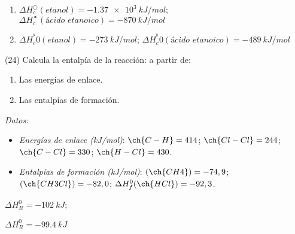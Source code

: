 \documentclass[10pt]{article}
\newenvironment{gexdatos}{
      \vspace{2pt}\noindent\textit{Datos: }
    }{\vspace{5pt}}
\begin{document}
\begin{multicols}{2}
\begin{solution}
  \begin{enumerate}
    \item \( \Delta H^○_c (\textit{etanol}) = \SI{-1.37e3}{kJ/mol} \); \newline
          \( \Delta H^\mdsmwhtcircle_c (\textit{ácido etanoico}) = \SI{-870}{kJ/mol} \) %
    \item \( \Delta H_c^^b0 (\textit{etanol}) = \SI{-273}{kJ/mol} \); \newline
          \( \Delta H_c^^b0 (\textit{ácido etanoico}) = \SI{-489}{kJ/mol} \) %
  \end{enumerate}
\end{solution}




\begin{exercise}[
    tags    = {},
    topics  = {química, termodinámica, termoquímica},
    source  = {FQ 1B MGH 2016, p168, e24},
  ]
  (24) Calcula la entalpía de la reacción:
   a partir de:
  \begin{enumerate}
    \item Las energías de enlace.
    \item Las entalpías de formación.
  \end{enumerate}

  \begin{gexdatos}
    \begin{itemize}
      \item \textit{Energías de enlace (\si{kJ/mol})}:
      \( \ch{C-H} = 414 \); \( \ch{Cl-Cl} = 244 \); \( \ch{C-Cl} = 330 \); \( \ch{H-Cl} = 430 \).
      \item \textit{Entalpías de formación (\si{kJ/mol})}:
      \( (\ch{CH4}) = -74,9 \); \( (\ch{CH3Cl}) = -82,0 \); \( \Delta H^0_f (\ch{HCl}) = -92,3 \).
    \end{itemize}
  \end{gexdatos}

\end{exercise}

\begin{solution}
  \begin{enumerate*}
    \item \( \Delta H^0_R = \SI{-102}{kJ} \); \item \( \Delta H^0_R = \SI{-99.4}{kJ} \)
  \end{enumerate*}
\end{solution}





\end{multicols}
\end{document}
